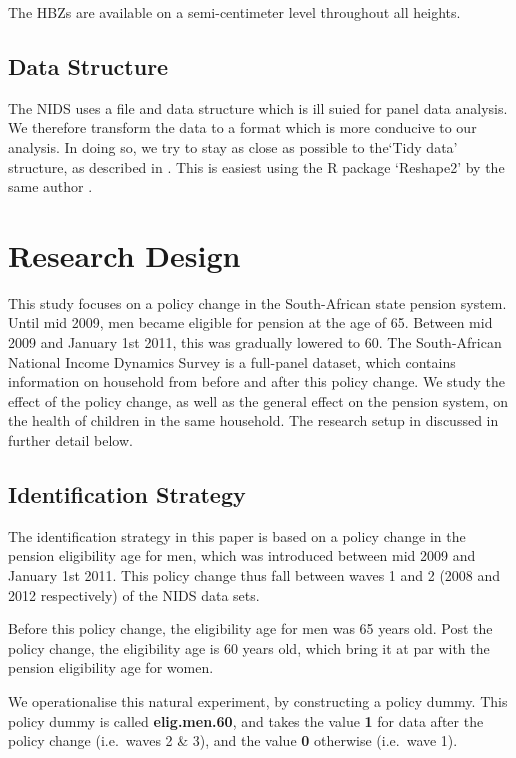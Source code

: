\begin{refsection}
The HBZs are available on a semi-centimeter level throughout all heights.

\subsection{Data Structure}
The NIDS uses a file and data structure which is ill suied for panel data analysis.
We therefore transform the data to a format which is more conducive to our analysis.
In doing so, we try to stay as close as possible to the`Tidy data' structure, as described in \textcite{wickham2014tidy}.
This is easiest using the R package `Reshape2' by the same author \parencite[Reshape2 implementation]{wickham2007reshaping}.

\section{Research Design}
This study focuses on a policy change in the South-African state pension system.
Until mid 2009, men became eligible for pension at the age of 65.
Between mid 2009 and January 1st 2011, this was gradually lowered to 60.
The South-African National Income Dynamics Survey is a full-panel dataset,
which contains information on household from before and after this policy change.
We study the effect of the policy change,
as well as the general effect on the pension system,
on the health of children in the same household.
The research setup in discussed in further detail below.


\subsection{Identification Strategy}
\label{sa:identification}
The identification strategy in this paper is based on a policy change in the pension eligibility age for men,
which was introduced between mid 2009 and January 1st 2011.
This policy change thus fall between waves 1 and 2 (2008 and 2012 respectively) of the NIDS data sets.

Before this policy change, the eligibility age for men was 65 years old.
Post the policy change, the eligibility age is 60 years old,
which bring it at par with the pension eligibility age for women.

We operationalise this natural experiment, by constructing a policy dummy.
This policy dummy is called \textbf{elig.men.60}, and takes the value \textbf{1}
for data after the policy change (i.e.~waves 2 \& 3), and the value \textbf{0} otherwise (i.e.~wave 1).


\end{refsection}
